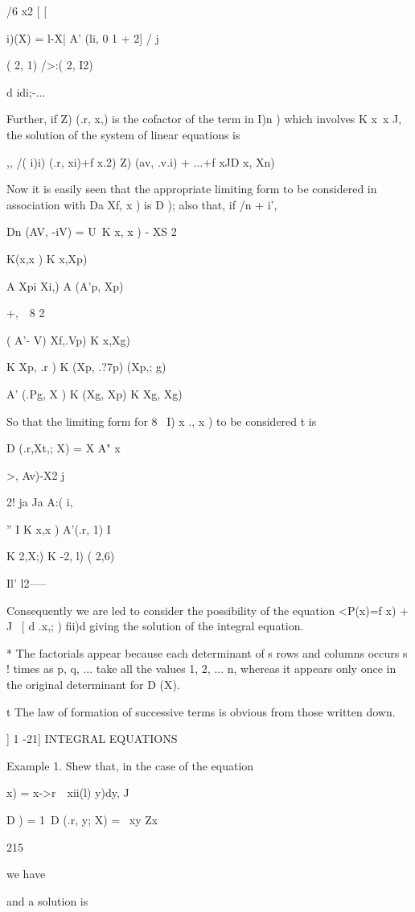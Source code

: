 /6 x2 [ [

i)(X) = l-X| A' (li, 0 1 + 2] / j

 ( 2, 1) />:( 2, I2)

d idi;-...

Further, if Z) (.r, x,) is the cofactor of the term in I)n ) which
involves K x\, x J, the solution of the system of linear equations is

,, /( i)i) (.r, xi)+f x.2) Z) (av, .v.i) + ...+f xJD x, Xn)

Now it is easily seen that the appropriate limiting form to be
considered in association with Da Xf, x ) is D ); also that, if /n +
i',

Dn (AV, -iV) = U\ K x, x ) - XS 2

K(x,x ) K x,Xp)

A Xpi Xi,) A (A'p, Xp)

+,\ \ 8 2

 ( A'- V) Xf,.Vp) K x,Xg)

K Xp, .r ) K (Xp, .?7p) (Xp,; g)

A' (.Pg, X ) K (Xg, Xp) K Xg, Xg)

So that the limiting form for 8~ I) x ., x ) to be considered t is

D (.r,Xt,; X) = X A" x

>, Av)-X2 j

2! ja Ja A:( i,

'' I K x,x ) A'(.r, 1) I

K 2,X;) K -2, l) ( 2,6)

 Il' l2-----

Consequently we are led to consider the possibility of the equation
<P(x)=f x) + J \ [ d .x,; ) fii)d giving the solution of the integral
equation.

* The factorials appear because each determinant of s rows and columns
occurs s ! times as p, q, ... take all the values 1, 2, ... n, whereas
it appears only once in the original determinant for D (X).

t The law of formation of successive terms is obvious from those
written down.

] 1 -21] INTEGRAL EQUATIONS

Example 1. Shew that, in the case of the equation

  x) = x->r\ \ xii(l) y)dy, J

D ) = 1\, D (.r, y; X) = \ xy Zx

215

we have

and a solution is

